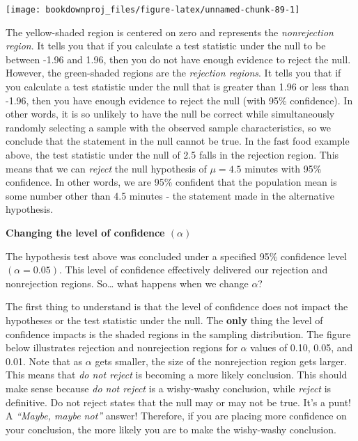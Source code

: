 \documentclass[
]{book}
\begin{document}
\begin{center}\texttt{[image: bookdownproj\_files/figure-latex/unnamed-chunk-89-1]} \end{center}

The yellow-shaded region is centered on zero and represents the \emph{nonrejection region}. It tells you that if you calculate a test statistic under the null to be between -1.96 and 1.96, then you do not have enough evidence to reject the null. However, the green-shaded regions are the \emph{rejection regions}. It tells you that if you calculate a test statistic under the null that is greater than 1.96 or less than -1.96, then you have enough evidence to reject the null (with 95\% confidence). In other words, it is so unlikely to have the null be correct while simultaneously randomly selecting a sample with the observed sample characteristics, so we conclude that the statement in the null cannot be true. In the fast food example above, the test statistic under the null of 2.5 falls in the rejection region. This means that we can \emph{reject} the null hypothesis of \(\mu=4.5\) minutes with 95\% confidence. In other words, we are 95\% confident that the population mean is some number other than 4.5 minutes - the statement made in the alternative hypothesis.

\textbf{Changing the level of confidence \((\alpha)\)}

The hypothesis test above was concluded under a specified 95\% confidence level \((\alpha=0.05)\). This level of confidence effectively delivered our rejection and nonrejection regions. So\ldots{} what happens when we change \(\alpha\)?

The first thing to understand is that the level of confidence does not impact the hypotheses or the test statistic under the null. The \textbf{only} thing the level of confidence impacts is the shaded regions in the sampling distribution. The figure below illustrates rejection and nonrejection regions for \(\alpha\) values of 0.10, 0.05, and 0.01. Note that as \(\alpha\) gets smaller, the size of the nonrejection region gets larger. This means that \emph{do not reject} is becoming a more likely conclusion. This should make sense because \emph{do not reject} is a wishy-washy conclusion, while \emph{reject} is definitive. Do not reject states that the null may or may not be true. It's a punt! A \emph{``Maybe, maybe not''} answer! Therefore, if you are placing more confidence on your conclusion, the more likely you are to make the wishy-washy conclusion.
\end{document}
